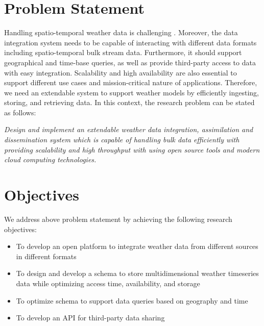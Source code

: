 \section{Problem Statement}
Handling spatio-temporal weather data is challenging . Moreover, the data integration system needs to be capable of interacting with different data formats including spatio-temporal bulk stream data. Furthermore, it should support geographical and time-base queries, as well as provide third-party access to data with easy integration. Scalability and high availability are also essential to support different use cases and mission-critical nature of applications. Therefore, we need an extendable system to support weather models by efficiently ingesting, storing, and retrieving data. In this context, the research problem can be stated as follows:
 
\emph{Design and implement an extendable weather data integration, assimilation and dissemination system which is capable of handling bulk data efficiently with providing scalability and high throughput with using open source tools and modern cloud computing technologies.}

\section{Objectives}
We address above problem statement by achieving the following research objectives:
\begin{itemize}
    \item To develop an open platform to integrate weather data from different sources in different formats
    \item To design and develop a schema to store multidimensional weather timeseries data while optimizing access time, availability, and storage
    \item To optimize schema to support data queries based on geography and time
    \item To develop an API for third-party data sharing
\end{itemize}
